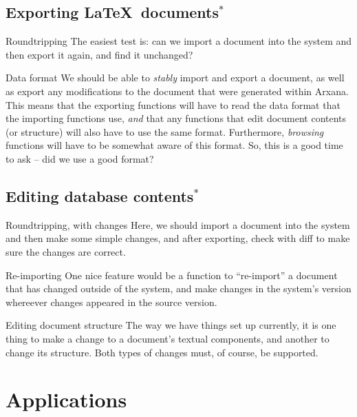 \subsection{Exporting \LaTeX\ documents$^*$}

\begin{notate}{Roundtripping}
The easiest test is: can we import a document into the
system and then export it again, and find it unchanged?
\end{notate}

\begin{notate}{Data format}
We should be able to \emph{stably} import and export a
document, as well as export any modifications to the
document that were generated within Arxana.  This means
that the exporting functions will have to read the data
format that the importing functions use, \emph{and} that
any functions that edit document contents (or structure)
will also have to use the same format.  Furthermore,
\emph{browsing} functions will have to be somewhat aware
of this format.  So, this is a good time to ask -- did we
use a good format?
\end{notate}

\subsection{Editing database contents$^*$} \label{editing}

\begin{notate}{Roundtripping, with changes}
Here, we should import a document into the system and then
make some simple changes, and after exporting, check with
diff to make sure the changes are correct.
\end{notate}

\begin{notate}{Re-importing}
One nice feature would be a function to ``re-import'' a
document that has changed outside of the system, and make
changes in the system's version whereever changes appeared
in the source version.
\end{notate}

\begin{notate}{Editing document structure}
The way we have things set up currently, it is one thing
to make a change to a document's textual components, and
another to change its structure.  Both types of changes
must, of course, be supported.
\end{notate}

\section{Applications}

